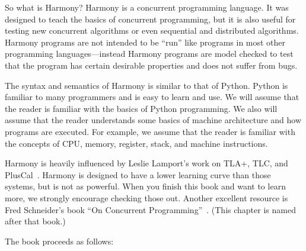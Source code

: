 \documentclass{report}
\begin{document}
So what is Harmony?
Harmony is a concurrent programming language.  It was designed to teach
the basics of concurrent programming, but it is also useful for
testing new concurrent algorithms or even sequential and distributed
algorithms.  Harmony programs are not intended to be ``run'' like programs
in most other programming languages---instead Harmony programs are
model checked to test that the program has certain desirable
properties and does not suffer from bugs.

The syntax and semantics of Harmony is similar to that of Python.
Python is familiar to many programmers and is easy to learn and
use.  We will assume that the reader is familiar with the basics
of Python programming.  We also will assume that the reader
understands some basics of machine architecture and how programs
are executed.  For example, we assume that the reader is familiar
with the concepts of CPU, memory, register, stack, and machine
instructions.

Harmony is heavily influenced by Leslie Lamport's work on
TLA+, TLC, and PlusCal~\cite{Lamport02, Lamport09}.
Harmony is designed to have a lower learning curve than those
systems, but is not as powerful.  When you finish this book
and want to learn more, we strongly encourage checking
those out.
Another excellent resource is Fred Schneider's book ``On
Concurrent Programming''~\cite{Schneider97}.
(This chapter is named after that book.)

The book proceeds as follows:
\end{document}
